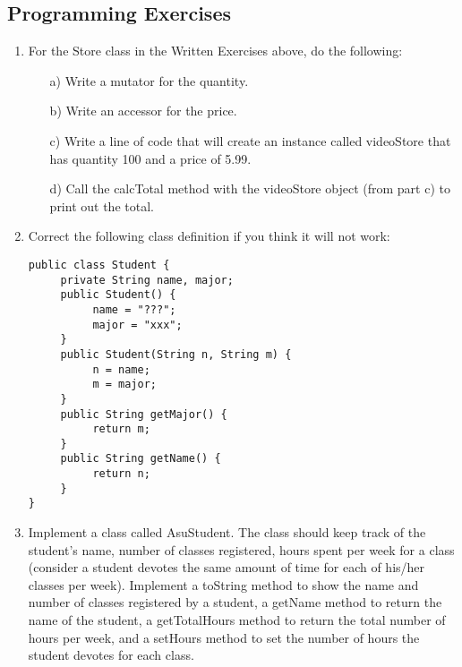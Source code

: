 \subsection{Programming Exercises}

\setcounter{counter}{1}
\begin{enumerate}[label={\arabic{counter}\addtocounter{counter}{1}}.]

\item For the Store class in the Written Exercises above, do the following:
\begin{enumerate}
\item[a)]Write a mutator for the quantity.
\item[b)]Write an accessor for the price.
\item[c)]Write a line of code that will create an instance called videoStore that has quantity 100 and a price of 5.99.
\item[d)]Call the calcTotal method with the videoStore object (from part c) to print out the total.
\end{enumerate}

\item Correct the following class definition if you think it will not work:
\begin{lstlisting}
public class Student {
     private String name, major;
     public Student() {
          name = "???";
          major = "xxx";
     }
     public Student(String n, String m) {
          n = name;
          m = major;
     }
     public String getMajor() {
          return m;
     }
     public String getName() {
          return n;
     }
}
\end{lstlisting}

\item Implement a class called AsuStudent. The class should keep track of the student's name, number of classes registered, hours spent per week for a class (consider a student devotes the same amount of time for each of his/her classes per week). Implement a toString method to show the name and number of classes registered by a student, a getName method to return the name of the student, a getTotalHours method to return the total number of hours per week, and a setHours method to set the number of hours the student devotes for each class.

\end{enumerate}